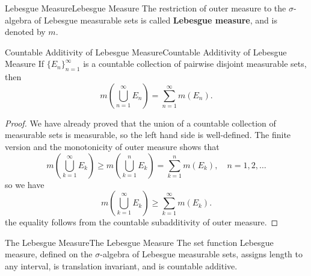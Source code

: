 \documentclass[../main.tex]{subfiles}
\begin{document}
\begin{definition}{Lebesgue Measure}{Lebesgue Measure}
  The restriction of outer measure to the $\sigma$-algebra of Lebesgue measurable sets is called \textbf{Lebesgue measure}, and is denoted by $m$.
\end{definition}

\begin{proposition}{Countable Additivity of Lebesgue Measure}{Countable Additivity of Lebesgue Measure}
  If $\{E_n\}_{n=1}^{\infty}$ is a countable collection of pairwise disjoint measurable sets, then
  \begin{equation}
    m\left(\bigcup_{n=1}^{\infty} E_n\right) = \sum_{n=1}^{\infty} m(E_n).
  \end{equation}
\end{proposition}
\begin{proof}
  We have already proved that the union of a countable collection of measurable sets is measurable, so the left hand side is well-defined. The finite version and the monotonicity of outer measure shows that
  \begin{equation*}
    m\left(\bigcup_{k=1}^{\infty } E_k\right) \geq m\left(\bigcup_{k=1}^{n} E_k\right) = \sum_{k=1}^{n} m(E_k), \quad n = 1, 2, \ldots
  \end{equation*}
  so we have
  \begin{equation*}
    m\left(\bigcup_{k=1}^{\infty } E_k\right) \geq \sum_{k=1}^{\infty} m(E_k).
  \end{equation*}
  the equality follows from the countable subadditivity of outer measure.
\end{proof}

\begin{theorem}{The Lebesgue Measure}{The Lebesgue Measure}
   The set function Lebesgue measure, defined on the $\sigma$-algebra of Lebesgue measurable sets, assigns length to any interval, is translation invariant, and is countable additive.
\end{theorem}
\end{document}

